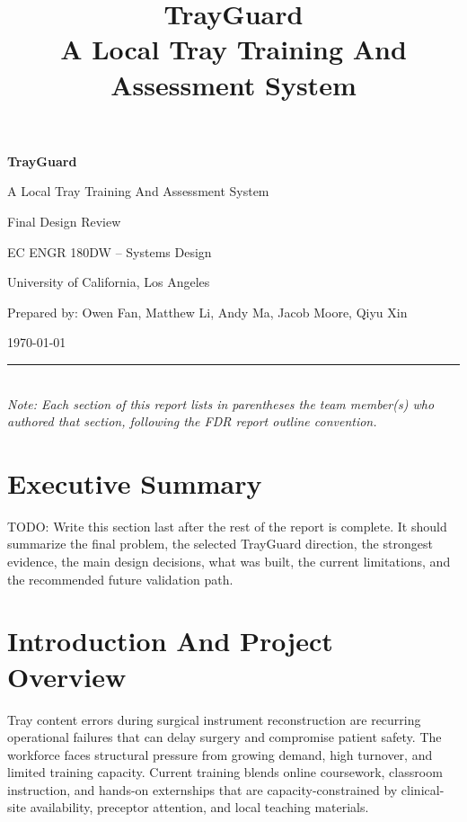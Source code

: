 \documentclass[10pt,a4paper]{article}
\title{TrayGuard\\A Local Tray Training And Assessment System}
\author{}
\date{}
\begin{document}
\begin{titlepage}
\centering
\vspace*{3cm}
{\Huge\bfseries TrayGuard\par}
\vspace{0.5cm}
{\Large A Local Tray Training And Assessment System\par}
\vspace{2cm}
{\large Final Design Review\par}
\vspace{1cm}
{\large EC ENGR 180DW -- Systems Design\par}
\vspace{0.5cm}
{\large University of California, Los Angeles\par}
\vspace{3cm}
{\large Prepared by: Owen Fan, Matthew Li, Andy Ma, Jacob Moore, Qiyu Xin\par}
\vspace{0.3cm}
{\large \today\par}
\vfill
\noindent\rule{\textwidth}{0.4pt}\\
\small{\textit{Note: Each section of this report lists in parentheses the team member(s) who authored that section, following the FDR report outline convention.}}
\end{titlepage}

\tableofcontents
\newpage






\section{Executive Summary}
\label{sec:executive-summary}

TODO: Write this section last after the rest of the report is complete. It should summarize the final problem, the selected TrayGuard direction, the strongest evidence, the main design decisions, what was built, the current limitations, and the recommended future validation path.





\section{Introduction And Project Overview}
\label{sec:introduction-and-project-overview}
Tray content errors during surgical instrument reconstruction are recurring
operational failures that can delay surgery and compromise patient safety. The
workforce faces structural pressure from growing demand, high turnover, and
limited training capacity. Current training blends online coursework,
classroom instruction, and hands-on externships that are capacity-constrained by
clinical-site availability, preceptor attention, and local
teaching materials.
\end{document}
